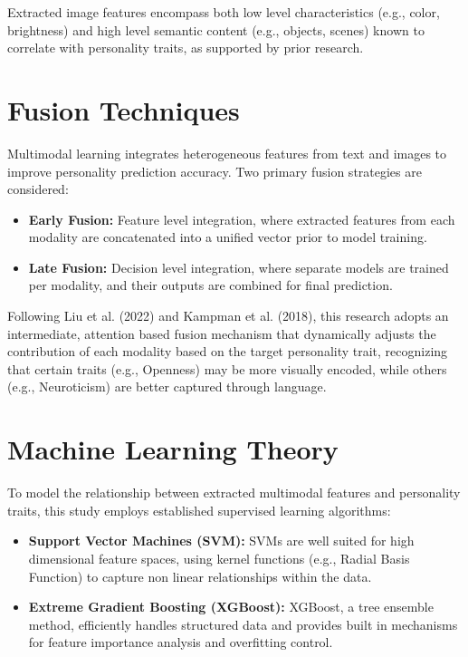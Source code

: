 Extracted image features encompass both low level characteristics (e.g., color, brightness) and high level semantic content (e.g., objects, scenes) known to correlate with personality traits, as supported by prior research.

\section{Fusion Techniques}

Multimodal learning integrates heterogeneous features from text and images to improve personality prediction accuracy. Two primary fusion strategies are considered:

\begin{itemize}
	\item \textbf{Early Fusion:} Feature level integration, where extracted features from each modality are concatenated into a unified vector prior to model training.
	\item \textbf{Late Fusion:} Decision level integration, where separate models are trained per modality, and their outputs are combined for final prediction.
\end{itemize}

Following Liu et al. (2022) and Kampman et al. (2018), this research adopts an intermediate, attention based fusion mechanism that dynamically adjusts the contribution of each modality based on the target personality trait, recognizing that certain traits (e.g., Openness) may be more visually encoded, while others (e.g., Neuroticism) are better captured through language.

\section{Machine Learning Theory}

To model the relationship between extracted multimodal features and personality traits, this study employs established supervised learning algorithms:

\begin{itemize}
	\item \textbf{Support Vector Machines (SVM):} SVMs are well suited for high dimensional feature spaces, using kernel functions (e.g., Radial Basis Function) to capture non linear relationships within the data.
	\item \textbf{Extreme Gradient Boosting (XGBoost):} XGBoost, a tree ensemble method, efficiently handles structured data and provides built in mechanisms for feature importance analysis and overfitting control.
\end{itemize}

